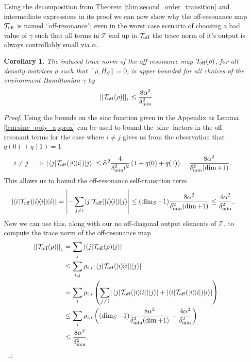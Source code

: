 \documentclass{article}
\newtheorem{corollary}[theorem]{Corollary}
\newcommand{\off}{\rm off}
\newcommand{\ket}[1]{|#1\rangle}
\newcommand{\bra}[1]{\langle #1|}
\newcommand{\ketbra}[2]{| #1\rangle\! \langle #2|}
\newcommand{\abs}[1]{\left| #1 \right|}
\newcommand{\norm}[1]{\left| \left| #1 \right| \right|}
\DeclareMathOperator{\sinc}{sinc}
\begin{document}
Using the decomposition from Theorem \ref{thm:second_order_transition} and intermediate expressions in its proof we can now show why the off-resonance map $\mathcal{T}_{\off}$ is named ``off-resonance"; even in the worst case scenario of choosing a bad value of $\gamma$ such that all terms in $\mathcal{T}$ end up in $\mathcal{T}_{\off}$ the trace norm of it's output is always controllably small via $\alpha$.
\begin{corollary} \label{cor:t_off_norm}
    The induced trace norm of the off-resonance map $\mathcal{T}_{\off}(\rho)$, for all density matrices $\rho$ such that $[\rho, H_S] = 0$, is upper bounded for all choices of the environment Hamiltonian $\gamma$ by
    \begin{align}
        \norm{\mathcal{T}_{\off}(\rho)}_1 \le \frac{8 \alpha^2}{\delta_{\min}^2}
    \end{align}
\end{corollary}
\begin{proof}
Using the bounds on the sinc function given in the Appendix as Lemma \ref{lem:sinc_poly_approx} can be used to bound the $\sinc$ factors in the off resonant terms for the case where $i\ne j$ gives us from the observation that $q(0)+q(1) =1$
    \begin{align}
        i \neq j \implies \abs{\bra{j}\mathcal{T}_{\off}(\ketbra{i}{i})\ket{j}} &\le \widetilde{\alpha}^2\frac{4}{\delta_{\min}^2 t^2} \left( 1 + q(0) + q(1)\right) = \frac{8 \alpha^2}{\delta_{\min}^2(\dim + 1)}.
    \end{align}
    This allows us to bound the off-resonance self-transition term
    \begin{align}
        \abs{\bra{i}\mathcal{T}_{\off}(\ketbra{i}{i})\ket{i}} &= \abs{- \sum_{j \neq i} \bra{j} \mathcal{T}_{\off}(\ketbra{i}{i}) \ket{j}} \le (\dim_S - 1) \frac{8 \alpha^2}{\delta_{\min}^2 (\dim + 1)} \le \frac{4 \alpha^2}{\delta_{\min}^2}.
    \end{align}
    Now we can use this, along with our no off-diagonal output elements of $\mathcal{T}$, to compute the trace norm of the off-resonance map
    \begin{align}
        \norm{\mathcal{T}_{\off}(\rho)}_1 &= \sum_{j} \abs{\bra{j} \mathcal{T}_{\off}(\rho) \ket{j}} \\
        &\le \sum_{i, j} \rho_{i,i} \abs{\bra{j}\mathcal{T}_{\off}(\ketbra{i}{i})\ket{j}} \\
        &= \sum_{i} \rho_{i,i} \left(\sum_{j \neq i} |\bra{j} \mathcal{T}_{\off}(\ketbra{i}{i}) \ket{j}| + |\bra{i} \mathcal{T}_{\off}(\ketbra{i}{i})\ket{i}| \right) \\
        &\le \sum_{i} \rho_{i,i} \left( (\dim_S - 1) \frac{8 \alpha^2}{\delta_{\min}^2(\dim + 1)} + \frac{4 \alpha^2}{\delta_{\min}^2} \right) \\
        &\le \frac{8 \alpha^2}{\delta_{\min}^2}.
    \end{align}
\end{proof}
\end{document}
